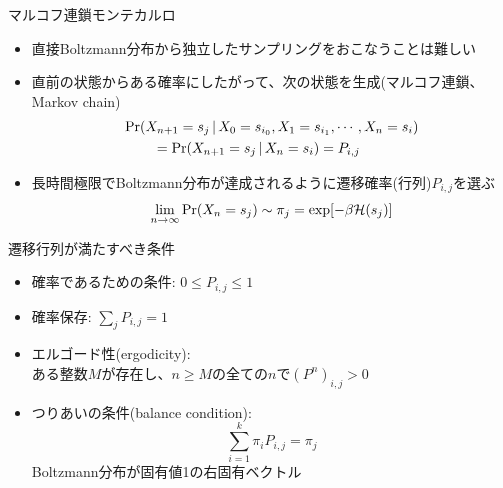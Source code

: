 \documentclass[dvipdfmx]{beamer}
\begin{document}
\begin{frame}[t,fragile]{マルコフ連鎖モンテカルロ}
  \begin{itemize}
    \setlength{\itemsep}{1em}
  \item 直接Boltzmann分布から独立したサンプリングをおこなうことは難しい
  \item 直前の状態からある確率にしたがって、次の状態を生成(マルコフ連鎖、Markov chain)
    \[
    \begin{split}
      &{\rm Pr}(X_{n+1}=s_j \,|\, X_0 = s_{i_0}, X_1 = s_{i_1}, \cdots, X_n = s_{i}) \\
      & \qquad = {\rm Pr}(X_{n+1}=s_j \,|\, X_n = s_{i}) = P_{i,j}
      \end{split}
    \]
    \item 長時間極限でBoltzmann分布が達成されるように遷移確率(行列)$P_{i,j}$を選ぶ
      \[
      \lim_{n\rightarrow\infty}{\rm Pr}(X_n=s_j) \sim \pi_j = \exp[-\beta {\cal H}(s_j)]
      \]
  \end{itemize}
\end{frame}

\begin{frame}[t,fragile]{遷移行列が満たすべき条件}
  \begin{itemize}
    \setlength{\itemsep}{1em}
  \item 確率であるための条件: $0 \le P_{i,j} \le 1$
  \item 確率保存: $\sum_j P_{i,j} = 1$
  \item エルゴード性(ergodicity): \\
    ある整数$M$が存在し、$n \ge M$の全ての$n$で$(P^n)_{i,j} > 0$
  \item つりあいの条件(balance condition):
    \[ \sum_{i=1}^k \pi_i P_{i,j} = \pi_j \]
    Boltzmann分布が固有値1の右固有ベクトル
  \end{itemize}
\end{frame}
\end{document}
